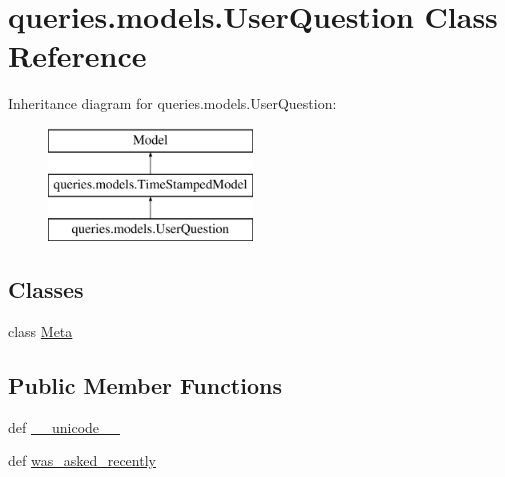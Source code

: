 \hypertarget{classqueries_1_1models_1_1_user_question}{\section{queries.\-models.\-User\-Question Class Reference}
\label{classqueries_1_1models_1_1_user_question}
}
Inheritance diagram for queries.\-models.\-User\-Question\-:\begin{figure}[H]
\begin{center}
\leavevmode
\includegraphics[height=3.000000cm]{classqueries_1_1models_1_1_user_question}
\end{center}
\end{figure}
\subsection*{Classes}
\begin{DoxyCompactItemize}
\item 
class \hyperlink{classqueries_1_1models_1_1_user_question_1_1_meta}{Meta}
\end{DoxyCompactItemize}
\subsection*{Public Member Functions}
\begin{DoxyCompactItemize}
\item 
def \hyperlink{classqueries_1_1models_1_1_user_question_ae3b9514e4b30ad1d74edeafb5a4ae3c9}{\-\_\-\-\_\-unicode\-\_\-\-\_\-}
\item 
def \hyperlink{classqueries_1_1models_1_1_user_question_a177afa95b1069ce137e78fd8fd8bed5a}{was\-\_\-asked\-\_\-recently}
\end{DoxyCompactItemize}
